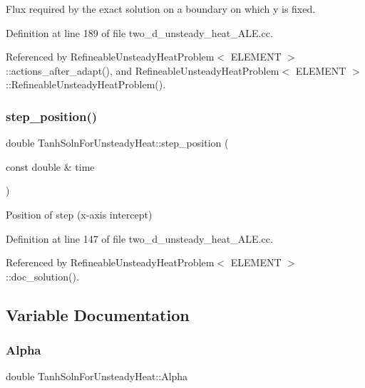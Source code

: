 Flux required by the exact solution on a boundary on which y is fixed. 



Definition at line 189 of file two\+\_\+d\+\_\+unsteady\+\_\+heat\+\_\+\+A\+L\+E.\+cc.



Referenced by Refineable\+Unsteady\+Heat\+Problem$<$ E\+L\+E\+M\+E\+N\+T $>$\+::actions\+\_\+after\+\_\+adapt(), and Refineable\+Unsteady\+Heat\+Problem$<$ E\+L\+E\+M\+E\+N\+T $>$\+::\+Refineable\+Unsteady\+Heat\+Problem().

\mbox{\label{namespaceTanhSolnForUnsteadyHeat_a99f50e575e38e80aa305ead2d4497272}} 
\subsubsection{\texorpdfstring{step\+\_\+position()}{step\_position()}}
{\footnotesize\ttfamily double Tanh\+Soln\+For\+Unsteady\+Heat\+::step\+\_\+position (\begin{DoxyParamCaption}\item[{const double \&}]{time }\end{DoxyParamCaption})}



Position of step (x-\/axis intercept) 



Definition at line 147 of file two\+\_\+d\+\_\+unsteady\+\_\+heat\+\_\+\+A\+L\+E.\+cc.



Referenced by Refineable\+Unsteady\+Heat\+Problem$<$ E\+L\+E\+M\+E\+N\+T $>$\+::doc\+\_\+solution().



\subsection{Variable Documentation}
\mbox{\label{namespaceTanhSolnForUnsteadyHeat_a4c75d9887d6f25405bbead696a94db63}} 
\subsubsection{\texorpdfstring{Alpha}{Alpha}}
{\footnotesize\ttfamily double Tanh\+Soln\+For\+Unsteady\+Heat\+::\+Alpha}



